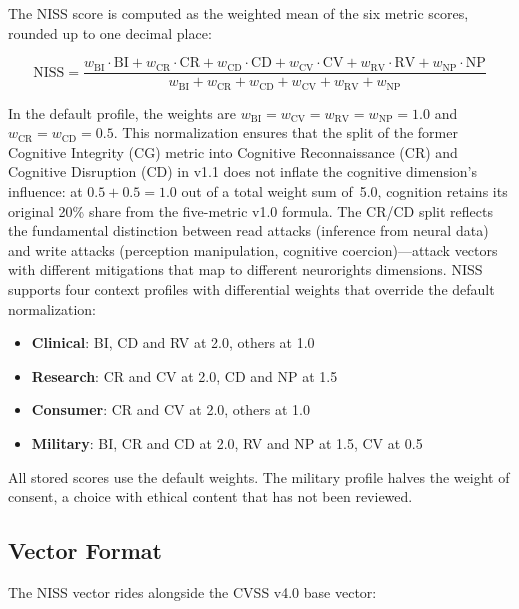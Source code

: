 The NISS score is computed as the weighted mean of the six metric scores, rounded up to
one decimal place:

\begin{equation}
\text{NISS} = \frac{w_{\text{BI}} \cdot \text{BI} + w_{\text{CR}} \cdot \text{CR} + w_{\text{CD}} \cdot \text{CD} + w_{\text{CV}} \cdot \text{CV} + w_{\text{RV}} \cdot \text{RV} + w_{\text{NP}} \cdot \text{NP}}
              {w_{\text{BI}} + w_{\text{CR}} + w_{\text{CD}} + w_{\text{CV}} + w_{\text{RV}} + w_{\text{NP}}}
\label{eq:niss}
\end{equation}

In the default profile, the weights are $w_{\text{BI}} = w_{\text{CV}} =
w_{\text{RV}} = w_{\text{NP}} = 1.0$ and $w_{\text{CR}} = w_{\text{CD}} = 0.5$.
This normalization ensures that the split of the former Cognitive Integrity (CG)
metric into Cognitive Reconnaissance (CR) and Cognitive Disruption (CD) in v1.1
does not inflate the cognitive dimension's influence: at $0.5 + 0.5 = 1.0$ out of
a total weight sum of~5.0, cognition retains its original 20\% share from the
five-metric v1.0 formula. The CR/CD split reflects the fundamental distinction
between read attacks (inference from neural data) and write attacks
(perception manipulation, cognitive coercion)---attack vectors with different
mitigations that map to different neurorights dimensions.
NISS supports four context profiles with differential weights that override
the default normalization:

\begin{itemize}
  \item \textbf{Clinical}: BI, CD and RV at 2.0, others at 1.0
  \item \textbf{Research}: CR and CV at 2.0, CD and NP at 1.5
  \item \textbf{Consumer}: CR and CV at 2.0, others at 1.0
  \item \textbf{Military}: BI, CR and CD at 2.0, RV and NP at 1.5, CV at 0.5
\end{itemize}

\noindent All stored scores use the default weights. The military profile halves the
weight of consent, a choice with ethical content that has not been reviewed.

\subsection{Vector Format}

The NISS vector rides alongside the CVSS v4.0 base vector:

